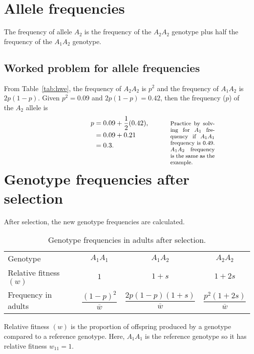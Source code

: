 \documentclass[letterpaper,nofonts]{tufte-handout}
\def\mathnote#1{%
  \tag*{\rlap{\hspace\marginparsep\smash{\parbox[t]{\marginparwidth}{%
  \footnotesize#1}}}}
}
\begin{document}
\section*{Allele frequencies}

The frequency of allele $A_2$ is the frequency of the $A_2A_2$ genotype plus half the frequency of the $A_1A_2$ genotype. 

\subsection*{Worked problem for allele frequencies}

From Table~\ref{tab:hwe}, the frequency of $A_2A_2$ is $p^2$ and the frequency of $A_1A_2$ is $2p(1-p)$. Given  $p^2 = 0.09$ and $2p(1-p) = 0.42$, then the frequency ($p$) of the $A_2$ allele is
{\setlength{\jot}{0.8em}
\begin{align*}
p &= 0.09 + \frac{1}{2}(0.42),\mathnote{Practice by solving for $A_1$ frequency if $A_1A_1$ frequency  is 0.49. $A_1A_2$ frequency is the same as the example.} \\
  &= 0.09 + 0.21  \\
  &= 0.3. 
\end{align*}
}

\section*{Genotype frequencies after selection}

After selection, the new genotype frequencies are calculated.

\begin{table}
\begin{tabular}{@{}lccc@{}}
\caption{Genotype frequencies in adults after selection.}\label{tab:selection_freqs}
Genotype	& 
$A_1A_1$	& 
$A_1A_2$	& 
$A_2A_2$ 	\tabularnewline[0.5em]
%
Relative fitness $(w)$	&
$1$			& 
$1 + s$		&
$1 + 2s$ 	\tabularnewline[0.5em]
%
Frequency in adults		&
$\dfrac{\left(1-p\right)^2}{\overline{w}}$	&
$\dfrac{2p\left(1-p\right)(1+s)}{\overline{w}}$	&
$\dfrac{p^2(1+2s)}{\overline{w}}$ \tabularnewline
\end{tabular}
\end{table}

\vspace{\baselineskip}

 Relative fitness $(w)$ is the proportion of offspring produced by a genotype compared to a reference genotype. Here, $A_1A_1$ is the reference genotype so it has relative fitness $w_{11} = 1$.
 
\end{document}
